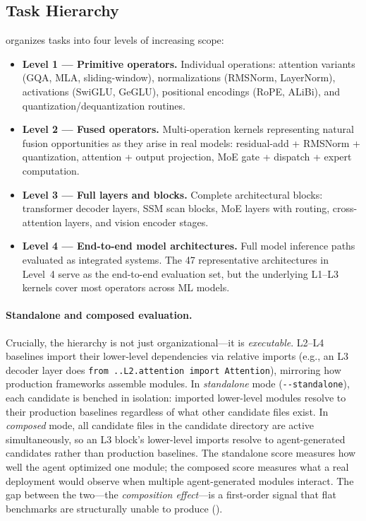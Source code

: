 \subsection{Task Hierarchy}
\label{fastkernels:sec:hierarchy}

\FastKernels organizes tasks into four levels of increasing scope:

\begin{itemize}[leftmargin=*, itemsep=2pt, topsep=2pt]
\item \textbf{Level 1 --- Primitive operators.}
Individual operations: attention variants (GQA, MLA, sliding-window), normalizations (RMSNorm, LayerNorm), activations (SwiGLU, GeGLU), positional encodings (RoPE, ALiBi), and quantization/dequantization routines.

\item \textbf{Level 2 --- Fused operators.}
Multi-operation kernels representing natural fusion opportunities as they arise in real models: residual-add + RMSNorm + quantization, attention + output projection, MoE gate + dispatch + expert computation.

\item \textbf{Level 3 --- Full layers and blocks.}
Complete architectural blocks: transformer decoder layers, SSM scan blocks, MoE layers with routing, cross-attention layers, and vision encoder stages.

\item \textbf{Level 4 --- End-to-end model architectures.}
Full model inference paths evaluated as integrated systems.
The 47 representative architectures in Level~4 serve as the end-to-end evaluation set, but the underlying L1--L3 kernels cover most operators across ML models.
\end{itemize}

\paragraph{Standalone and composed evaluation.}
Crucially, the hierarchy is not just organizational---it is \emph{executable}.
L2--L4 baselines import their lower-level dependencies via relative imports (e.g., an L3 decoder layer does \texttt{from~..L2.attention~import~Attention}), mirroring how production frameworks assemble modules.
In \emph{standalone} mode (\texttt{-{}-standalone}), each candidate is benched in isolation: imported lower-level modules resolve to their production baselines regardless of what other candidate files exist.
In \emph{composed} mode, all candidate files in the candidate directory are active simultaneously, so an L3 block's lower-level imports resolve to agent-generated candidates rather than production baselines.
The standalone score measures how well the agent optimized one module; the composed score measures what a real deployment would observe when multiple agent-generated modules interact.
The gap between the two---the \emph{composition effect}---is a first-order signal that flat benchmarks are structurally unable to produce ().


